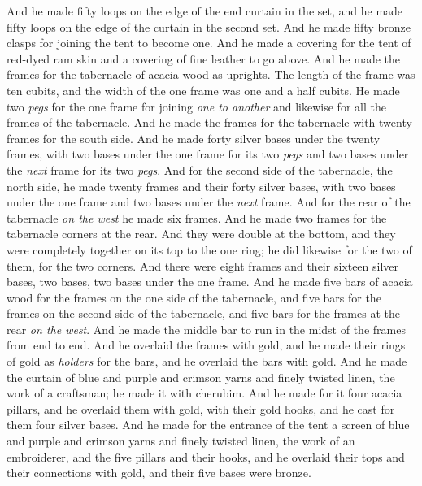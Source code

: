 \begin{biblechapter}
\verse And he made fifty loops on the edge of the end curtain in the set, and he made fifty loops on the edge of the curtain in the second set.
\verse And he made fifty bronze clasps for joining the tent to become one.
\verse And he made a covering for the tent of red-dyed ram skin and a covering of fine leather to go above.
\verse And he made the frames for the tabernacle of acacia wood as uprights.
\verse The length of the frame was ten cubits, and the width of the one frame was one and a half cubits.
\verse He made two \textit{pegs} for the one frame for joining \textit{one to another} and likewise for all the frames of the tabernacle.
\verse And he made the frames for the tabernacle with twenty frames for the south side.
\verse And he made forty silver bases under the twenty frames, with two bases under the one frame for its two \textit{pegs} and two bases under the \textit{next} frame for its two \textit{pegs}.
\verse And for the second side of the tabernacle, the north side, he made twenty frames
\verse and their forty silver bases, with two bases under the one frame and two bases under the \textit{next} frame.
\verse And for the rear of the tabernacle \textit{on the west} he made six frames.
\verse And he made two frames for the tabernacle corners at the rear.
\verse And they were double at the bottom, and they were completely together on its top to the one ring; he did likewise for the two of them, for the two corners.
\verse And there were eight frames and their sixteen silver bases, two bases, two bases under the one frame.
\verse And he made five bars of acacia wood for the frames on the one side of the tabernacle,
\verse and five bars for the frames on the second side of the tabernacle, and five bars for the frames at the rear \textit{on the west}.
\verse And he made the middle bar to run in the midst of the frames from end to end.
\verse And he overlaid the frames with gold, and he made their rings of gold as \textit{holders} for the bars, and he overlaid the bars with gold.
\verse And he made the curtain of blue and purple and crimson yarns and finely twisted linen, the work of a craftsman; he made it with cherubim.
\verse And he made for it four acacia pillars, and he overlaid them with gold, with their gold hooks, and he cast for them four silver bases.
\verse And he made for the entrance of the tent a screen of blue and purple and crimson yarns and finely twisted linen, the work of an embroiderer,
\verse and the five pillars and their hooks, and he overlaid their tops and their connections with gold, and their five bases were bronze.
\end{biblechapter}

